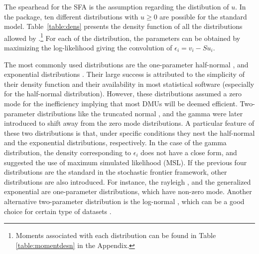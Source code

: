 \documentclass[nojss]{jss}
\begin{document}
The spearhead for the SFA is the assumption regarding the distibution of $u$. 
In the  package, ten different distributions with $u \geq 0$ are 
possible for the standard model. Table~\ref{table:dens} presents the density 
function of all the distributions allowed by .\footnote{Moments associated
with each distribution can be found in Table \ref{table:momentdesn} in the 
Appendix.} For each of the distribution, the parameters can be obtained by 
maximizing the log-likelihood giving the convolution of $\epsilon_i=v_i - Su_i$. 

The most commonly used distributions are the one-parameter half-normal 
\citep{aig77}, and exponential distributions \citep{mee77}. Their large success 
is attributed to the simplicity of their density function and their availability 
in most statistical software (especially for the half-normal distribution). 
However, these distributions assumed a zero mode for the inefficiency implying 
that most DMUs will be deemed efficient. Two-parameter distributions like the 
truncated normal \citep{ste80, kum87}, and the gamma \citep{ste80, beckers87, greene90, greene03}
were later introduced to shift away from the zero mode distributions. 
A particular feature of these two distributions is that, under specific 
conditions they nest the half-normal and the exponential distributions, 
respectively. In the case of the gamma distribution, the density corresponding 
to $\epsilon_i$ does not have a close form, and \citet{greene03} suggested the 
use of maximum simulated likelihood (MSL). If the previous four distributions 
are the standard in the stochastic frontier framework, other 
distributions are also introduced. For instance, the rayleigh \citep{oliv14, 
hajar15, wang20}, and the generalized exponential \citep{papa21} are 
one-parameter distributions, which have non-zero mode. Another alternative 
two-parameter distribution is the log-normal \citep{wang20}, 
which can be a good choice for certain type of datasets \citep{migon01, rama12}.
\end{document}

